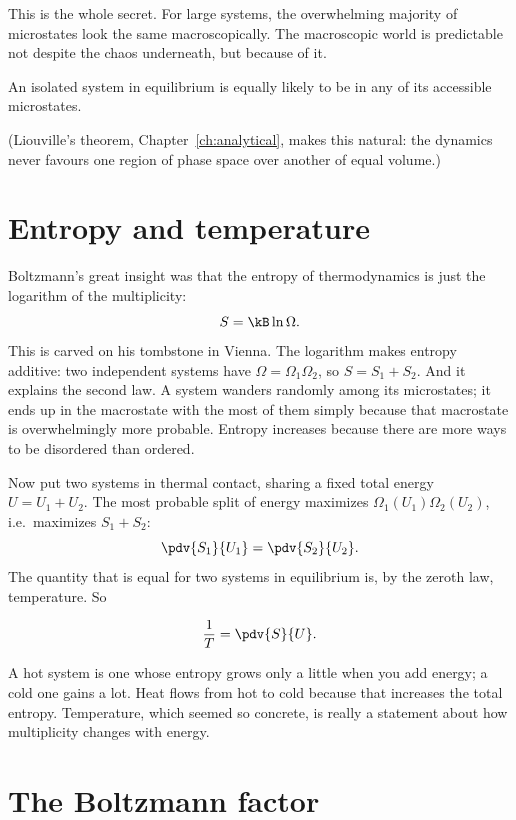 This is the whole secret. For large systems, the overwhelming majority of microstates look the same macroscopically. The macroscopic world is predictable not despite the chaos underneath, but because of it.

\begin{law}
An isolated system in equilibrium is equally likely to be in any of its accessible microstates.
\end{law}

(Liouville's theorem, Chapter~\ref{ch:analytical}, makes this natural: the dynamics never favours one region of phase space over another of equal volume.)

\section{Entropy and temperature}

Boltzmann's great insight was that the entropy of thermodynamics is just the logarithm of the multiplicity:
\[
  S = \kB\ln\Omega .
\]
This is carved on his tombstone in Vienna. The logarithm makes entropy additive: two independent systems have $\Omega = \Omega_1\Omega_2$, so $S = S_1 + S_2$. And it explains the second law. A system wanders randomly among its microstates; it ends up in the macrostate with the most of them simply because that macrostate is overwhelmingly more probable. Entropy increases because there are more ways to be disordered than ordered.

Now put two systems in thermal contact, sharing a fixed total energy $U = U_1 + U_2$. The most probable split of energy maximizes $\Omega_1(U_1)\Omega_2(U_2)$, i.e.\ maximizes $S_1+S_2$:
\[
  \pdv{S_1}{U_1} = \pdv{S_2}{U_2} .
\]
The quantity that is equal for two systems in equilibrium is, by the zeroth law, temperature. So

\begin{definition}[Temperature]
\[
  \frac{1}{T} = \pdv{S}{U}.
\]
\end{definition}
A hot system is one whose entropy grows only a little when you add energy; a cold one gains a lot. Heat flows from hot to cold because that increases the total entropy. Temperature, which seemed so concrete, is really a statement about how multiplicity changes with energy.

\section{The Boltzmann factor}


